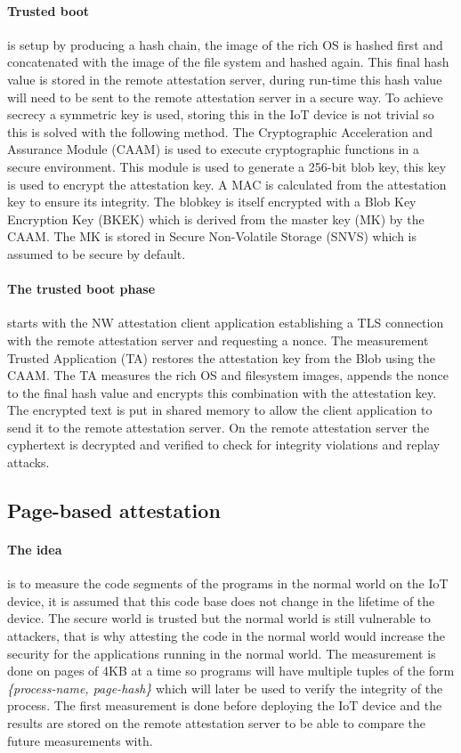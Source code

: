 \documentclass{report}
\begin{document}
\paragraph*{Trusted boot}
is setup by producing a hash chain, the image of the rich OS is hashed first and concatenated with the image of the file system and hashed again. This final hash value is stored in the remote attestation server, during run-time this hash value will need to be sent to the remote attestation server in a secure way. To achieve secrecy a symmetric key is used, storing this in the IoT device is not trivial so this is solved with the following method. The Cryptographic Acceleration and Assurance Module (CAAM) is used to execute cryptographic functions in a secure environment. This module is used to generate a 256-bit blob key, this key is used to encrypt the attestation key. A MAC is calculated from the attestation key to ensure its integrity. The blobkey is itself encrypted with a Blob Key Encryption Key (BKEK) which is derived from the master key (MK) by the CAAM. The MK is stored in Secure Non-Volatile Storage (SNVS) which is assumed to be secure by default.

\paragraph*{The trusted boot phase}
starts with the NW attestation client application establishing a TLS connection with the remote attestation server and requesting a nonce. The measurement Trusted Application (TA) restores the attestation key from the Blob using the CAAM. The TA measures the rich OS and filesystem images, appends the nonce to the final hash value and encrypts this combination with the attestation key. The encrypted text is put in shared memory to allow the client application to send it to the remote attestation server. On the remote attestation server the cyphertext is decrypted and verified to check for integrity violations and replay attacks.

\subsection*{Page-based attestation}

\paragraph*{The idea}
is to measure the code segments of the programs in the normal world on the IoT device, it is assumed that this code base does not change in the lifetime of the device. The secure world is trusted but the normal world is still vulnerable to attackers, that is why attesting the code in the normal world would increase the security for the applications running in the normal world. The measurement is done on pages of 4KB at a time so programs will have multiple tuples of the form \textit{\{process-name, page-hash\}} which will later be used to verify the integrity of the process. The first measurement is done before deploying the IoT device and the results are stored on the remote attestation server to be able to compare the future measurements with. 
\end{document}
